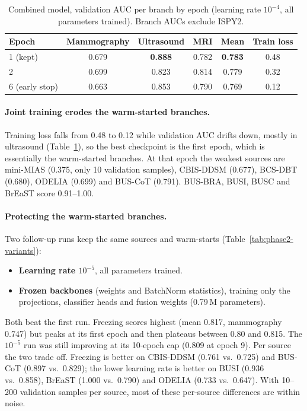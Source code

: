 \documentclass[11pt]{article}
\begin{document}
\begin{table}[htbp]
  \centering
  \caption{Combined model, validation AUC per branch by epoch (learning rate $10^{-4}$, all parameters trained). Branch AUCs exclude ISPY2.}
  \label{tab:phase2}
  \begin{tabular}{@{}l c c c c c@{}}
    \toprule
    Epoch & Mammography & Ultrasound & MRI & Mean & Train loss \\
    \midrule
    1 (kept) & 0.679 & \textbf{0.888} & 0.782 & \textbf{0.783} & 0.48 \\
    2 & 0.699 & 0.823 & 0.814 & 0.779 & 0.32 \\
    6 (early stop) & 0.663 & 0.853 & 0.790 & 0.769 & 0.12 \\
    \bottomrule
  \end{tabular}
\end{table}

\paragraph{Joint training erodes the warm-started branches.} Training loss
falls from 0.48 to 0.12 while validation AUC drifts down, mostly in
ultrasound (Table~\ref{tab:phase2}), so the best checkpoint is the first
epoch, which is essentially the warm-started branches. At that epoch the
weakest sources are mini-MIAS (0.375, only 10 validation samples), CBIS-DDSM
(0.677), BCS-DBT (0.680), ODELIA (0.699) and BUS-CoT (0.791). BUS-BRA, BUSI,
BUSC and BrEaST score 0.91--1.00.

\paragraph{Protecting the warm-started branches.} Two follow-up runs keep the
same sources and warm-starts (Table~\ref{tab:phase2-variants}):
\begin{itemize}
  \item \textbf{Learning rate $10^{-5}$}, all parameters trained.
  \item \textbf{Frozen backbones} (weights and BatchNorm statistics), training
    only the projections, classifier heads and fusion weights (0.79\,M
    parameters).
\end{itemize}
Both beat the first run. Freezing scores highest (mean 0.817, mammography
0.747) but peaks at its first epoch and then plateaus between 0.80 and 0.815.
The $10^{-5}$ run was still improving at its 10-epoch cap (0.809 at epoch 9).
Per source the two trade off. Freezing is better on CBIS-DDSM (0.761 vs.\
0.725) and BUS-CoT (0.897 vs.\ 0.829); the lower learning rate is better on
BUSI (0.936 vs.\ 0.858), BrEaST (1.000 vs.\ 0.790) and ODELIA (0.733 vs.\
0.647). With 10--200 validation samples per source, most of these per-source
differences are within noise.
\end{document}
